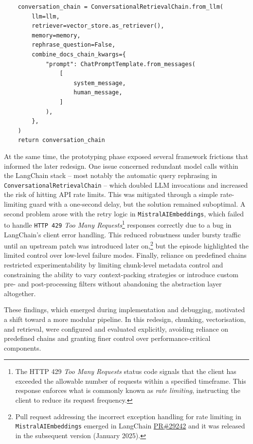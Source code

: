 \begin{spacing}{1.5}
\begin{lstlisting}
    conversation_chain = ConversationalRetrievalChain.from_llm(
        llm=llm,
        retriever=vector_store.as_retriever(),
        memory=memory,
        rephrase_question=False,
        combine_docs_chain_kwargs={
            "prompt": ChatPromptTemplate.from_messages(
                [
                    system_message,
                    human_message,
                ]
            ),
        },
    )
    return conversation_chain
\end{lstlisting}



At the same time, the prototyping phase exposed several framework frictions that informed the later redesign. One issue concerned redundant model calls within the LangChain stack -- most notably the automatic query rephrasing in \texttt{ConversationalRetrievalChain} -- which doubled LLM invocations and increased the risk of hitting API rate limits. This was mitigated through a simple rate-limiting guard with a one-second delay, but the solution remained suboptimal. A second problem arose with the retry logic in \texttt{MistralAIEmbeddings}, which failed to handle \texttt{HTTP 429} \textit{Too Many Requests}\footnote{The HTTP 429 \textit{Too Many Requests} status code signals that the client has exceeded the allowable number of requests within a specified timeframe. This response enforces what is commonly known as \textit{rate limiting}, instructing the client to reduce its request frequency.} responses correctly due to a bug in LangChain’s client error handling. This reduced robustness under bursty traffic until an upstream patch was introduced later on,\footnote{Pull request addressing the incorrect exception handling for rate limiting in \texttt{MistralAIEmbeddings} emerged in LangChain \href{https://web.archive.org/web/20250823161804/https://github.com/langchain-ai/langchain/pull/29242}{PR\#29242} and it was released in the subsequent version (January 2025).}\nocite{noauthor_mistralai_2025} but the episode highlighted the limited control over low-level failure modes. Finally, reliance on predefined chains restricted experimentability by limiting chunk-level metadata control and constraining the ability to vary context-packing strategies or introduce custom pre- and post-processing filters without abandoning the abstraction layer altogether.

These findings, which emerged during implementation and debugging, motivated a shift toward a more modular pipeline. In this redesign, chunking, vectorisation, and retrieval, were configured and evaluated explicitly, avoiding reliance on predefined chains and granting finer control over performance-critical components.


\end{spacing}
